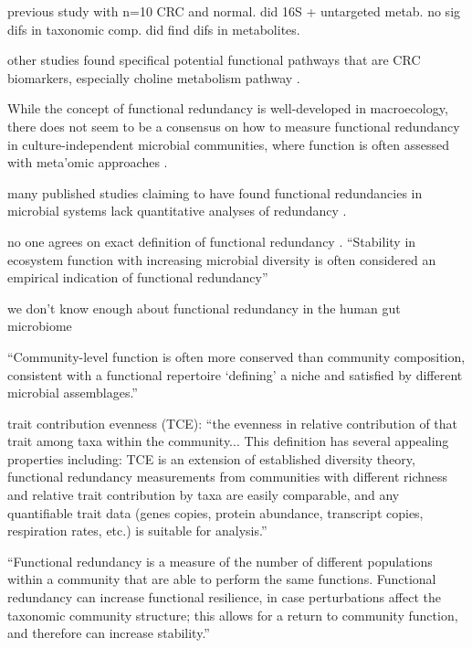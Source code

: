 \documentclass[11pt]{article}
\begin{document}
previous study with n=10 CRC and normal. did 16S + untargeted metab. no sig difs in taxonomic comp. did find difs in metabolites. \cite{weir_stool_2013}

other studies found specifical potential functional pathways that are CRC biomarkers, especially choline metabolism pathway \cite{thomas_metagenomic_2019}.

While the concept of functional redundancy is well-developed in macroecology,
there does not seem to be a consensus on how to measure functional redundancy in culture-independent microbial communities,
where function is often assessed with meta'omic approaches \cite{ricotta_measuring_2016, louca_function_2018, heintz-buschart_human_2018, royalty_quantitative_2020}.

many published studies claiming to have found functional redundancies in microbial systems lack quantitative analyses of redundancy \cite{souza_metagenomic_2015, ferrer_microbiota_2013, galambos_genome-resolved_2019}.

no one agrees on exact definition of functional redundancy \cite{louca_function_2018, heintz-buschart_human_2018, tully_dynamic_2018, royalty_quantitative_2020}.
``Stability in ecosystem function with increasing microbial diversity is often considered an empirical indication of functional redundancy''
\cite{royalty_quantitative_2020}

we don't know enough about functional redundancy in the human gut microbiome \cite{heintz-buschart_human_2018}

``Community-level function is often more conserved than community composition, consistent with a functional repertoire ‘defining’ a niche and satisfied by different microbial assemblages.'' \cite{franzosa_species-level_2018}




trait contribution evenness (TCE): ``the evenness in relative contribution of that trait among taxa within the community... This definition has several appealing properties including: TCE is an extension of established diversity theory, functional redundancy measurements from communities with different richness and relative trait contribution by taxa are easily comparable, and any quantifiable trait data (genes copies, protein abundance, transcript copies, respiration rates, etc.) is suitable for analysis.'' \cite{royalty_quantitative_2020}

``Functional redundancy is a measure of the number of different populations within a community that are able to perform the same functions. Functional redundancy can increase functional resilience, in case perturbations affect the taxonomic community structure; this allows for a return to community function, and therefore can increase stability.'' \cite{heintz-buschart_human_2018}
\end{document}
